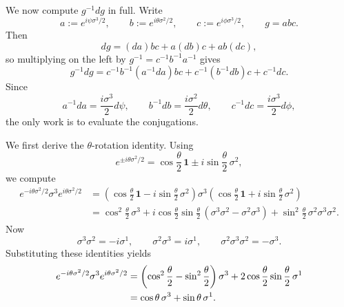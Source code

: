\noindent We now compute $g^{-1}dg$ in full. Write
\begin{equation*}
a := e^{i\psi\sigma^3/2},
\qquad
b := e^{i\theta\sigma^2/2},
\qquad
c := e^{i\phi\sigma^3/2},
\qquad
g = abc.
\end{equation*}
Then
\begin{equation*}
dg = (da)bc + a(db)c + ab(dc),
\end{equation*}
so multiplying on the left by $g^{-1} = c^{-1}b^{-1}a^{-1}$ gives
\begin{equation}\label{eq:g-inv-dg-split}
g^{-1}dg = c^{-1}b^{-1}(a^{-1}da)bc + c^{-1}(b^{-1}db)c + c^{-1}dc.
\end{equation}
Since
\begin{equation*}
a^{-1}da = \frac{i\sigma^3}{2}d\psi,
\qquad
b^{-1}db = \frac{i\sigma^2}{2}d\theta,
\qquad
c^{-1}dc = \frac{i\sigma^3}{2}d\phi,
\end{equation*}
the only work is to evaluate the conjugations.

\medskip

\noindent We first derive the $\theta$-rotation identity. Using
\begin{equation*}
e^{\pm i\theta\sigma^2/2} = \cos\frac{\theta}{2}\,\mathbf{1} \pm i\sin\frac{\theta}{2}\,\sigma^2,
\end{equation*}
we compute
\begin{align*}
e^{-i\theta\sigma^2/2}\sigma^3 e^{i\theta\sigma^2/2}
&=
\left(\cos\frac{\theta}{2}\,\mathbf{1} - i\sin\frac{\theta}{2}\,\sigma^2\right)
\sigma^3
\left(\cos\frac{\theta}{2}\,\mathbf{1} + i\sin\frac{\theta}{2}\,\sigma^2\right) \\
&=
\cos^2\frac{\theta}{2}\,\sigma^3
+ i\cos\frac{\theta}{2}\sin\frac{\theta}{2}\,(\sigma^3\sigma^2 - \sigma^2\sigma^3)
+ \sin^2\frac{\theta}{2}\,\sigma^2\sigma^3\sigma^2.
\end{align*}
Now
\begin{equation*}
\sigma^3\sigma^2 = -i\sigma^1,
\qquad
\sigma^2\sigma^3 = i\sigma^1,
\qquad
\sigma^2\sigma^3\sigma^2 = -\sigma^3.
\end{equation*}
Substituting these identities yields
\begin{align}
e^{-i\theta\sigma^2/2}\sigma^3 e^{i\theta\sigma^2/2}
&=
\left(\cos^2\frac{\theta}{2} - \sin^2\frac{\theta}{2}\right)\sigma^3
+ 2\cos\frac{\theta}{2}\sin\frac{\theta}{2}\,\sigma^1 \notag\\
&= \cos\theta\,\sigma^3 + \sin\theta\,\sigma^1.
\label{eq:theta-conjugation}
\end{align}

